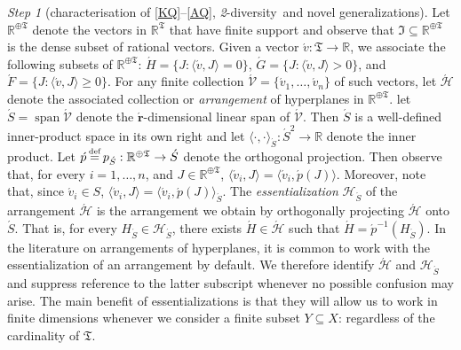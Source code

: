 \documentclass[ecta,nameyear,draft]{econsocart}
\newcommand{\R}{\mathbb R}
\newcommand{\mc}{\mathcal}
\newcommand\defeq{\mathrel{\overset{\makebox[0pt]{\mbox{\normalfont\tiny def}}}{=}}}%
\newcommand{\spann}{\operatorname{span}}
\newcommand{\mbbtpp}{{\mathfrak{T}}}
\newcommand{\mbbjpp}{\mathfrak{I}}
\newcommand{\twodiv}{\textit{2}-\textup{diversity}}
\theoremstyle{plain}
\theoremstyle{remark}
\newtheorem{step}{Step}[section]
\begin{document}
\begin{appendix}
\begin{step}[characterisation of \ref{KQ}–\ref{AQ}, \twodiv\ and novel
      generalizations]
    Let $\R^{\oplus\mbbtpp}$ denote the vectors in $\R^{\mbbtpp}$ that have
    finite support and observe that $\mbbjpp \subseteq \R^{\oplus\mbbtpp}$ is the
    dense subset of rational vectors.  Given a vector $\acute{v}: \mbbtpp
    \rightarrow \R$, we associate the following subsets of $\R^{\oplus\mbbtpp}$:
    $\acute H = \{J : \langle \acute v , J \rangle = 0 \}$, $\acute G = \{J :
    \langle \acute v, J \rangle > 0\}$, and $\acute F = \{J : \langle \acute v,
    J \rangle \geq 0\}$. For any finite collection $\acute{\mc V} = \{\acute{v}_1,
    \dots, \acute{v}_n\}$ of such vectors, let $\acute{\mc H}$ denote the
    associated collection or \emph{arrangement} of hyperplanes in
    $\R^{\oplus\mbbtpp}$. let $\acute{S} = \spann \acute{\mc V}$ denote the
    $\acute{\mathbf{r}}$-dimensional linear span of $\acute{\mc V}$. Then
    $\acute S$ is a well-defined inner-product space in its own right and let
    $\langle \cdot , \cdot \rangle_{\acute{S}}: \acute{S}^2 \rightarrow \R$ denote
    the inner product. Let $\acute{p} \defeq p_{\acute{S}}: \R^{\oplus\mbbtpp}
    \rightarrow \acute{S}$ denote the orthogonal projection. Then observe that,
    for every $i = 1, \dots,
    n$, and $J \in \R^{\oplus\mbbtpp}$, $\langle \acute{v}_i, J \rangle = \langle
    \acute{v}_i, \acute{p}(J)\rangle$. Moreover, note that, since $\acute{v}_i \in
    S$, $\langle \acute{v}_i, J \rangle = \langle \acute{v}_i, \acute{p}(J)
    \rangle_{\acute{S}}$.  The \emph{essentialization} ${\mc H}_{\acute{S}}$ of
    the arrangement $\acute{\mc H}$ is the arrangement we obtain by orthogonally
    projecting $\acute{\mc H}$ onto $\acute{S}$.  That is, for every $H_{\acute{S}}
    \in {\mc H}_{\acute{S}}$, there exists $\acute{H} \in \acute{\mc H}$ such that
    $\acute{H} = \acute{p}^{-1}(H_{\acute{S}})$.  In the literature on
    arrangements of hyperplanes, it is common to work with the essentialization
    of an arrangement by default.  We therefore identify $\acute{\mc H}$ and
    $\mc{H}_{\acute{S}}$ and suppress reference to the latter subscript
    whenever no possible confusion may arise. The main benefit of
    essentializations is that they will allow us to work in finite dimensions
    whenever we consider a finite subset $Y\subseteq X$: regardless of the
    cardinality of $\mbbtpp$.

\end{step}
\end{appendix}
\end{document}
